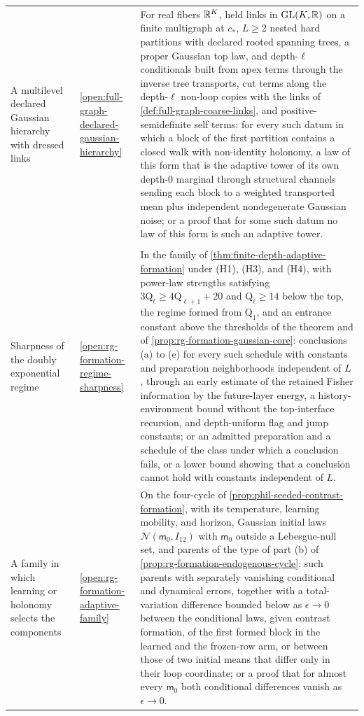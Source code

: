 {\begin{longtable}{@{}>{\raggedright\arraybackslash}p{}
>{\raggedright\arraybackslash}p{}
>{\raggedright\arraybackslash}p{}@{}}
A multilevel declared Gaussian hierarchy with dressed links & \cref{open:full-graph-declared-gaussian-hierarchy} & For real fibers $\mathbb R^K$, held links in $\mathrm{GL}(K,\mathbb R)$ on a finite multigraph at $c_*$, $L\ge2$ nested hard partitions with declared rooted spanning trees, a proper Gaussian top law, and depth-$\ell$ conditionals built from apex terms through the inverse tree transports, cut terms along the depth-$\ell$ non-loop copies with the links of \cref{def:full-graph-coarse-links}, and positive-semidefinite self terms: for every such datum in which a block of the first partition contains a closed walk with non-identity holonomy, a law of this form that is the adaptive tower of its own depth-$0$ marginal through structural channels sending each block to a weighted transported mean plus independent nondegenerate Gaussian noise; or a proof that for some such datum no law of this form is such an adaptive tower. \\
\multicolumn{3}{@{}l}{\textbf{Part III: formation and interpretation}} \\
Sharpness of the doubly exponential regime & \cref{open:rg-formation-regime-sharpness} & In the family of \cref{thm:finite-depth-adaptive-formation} under (H1), (H3), and (H4), with power-law strengths satisfying $3\mathrm Q_\ell\ge4\mathrm Q_{\ell+1}+20$ and $\mathrm Q_\ell\ge14$ below the top, the regime formed from $\mathrm Q_1$, and an entrance constant above the thresholds of the theorem and of \cref{prop:rg-formation-gaussian-core}: conclusions (a) to (e) for every such schedule with constants and preparation neighborhoods independent of $L$, through an early estimate of the retained Fisher information by the future-layer energy, a history-environment bound without the top-interface recursion, and depth-uniform flag and jump constants; or an admitted preparation and a schedule of the class under which a conclusion fails, or a lower bound showing that a conclusion cannot hold with constants independent of $L$. \\
A family in which learning or holonomy selects the components & \cref{open:rg-formation-adaptive-family} & On the four-cycle of \cref{prop:phil-seeded-contrast-formation}, with its temperature, learning mobility, and horizon, Gaussian initial laws $\mathcal N(\mathsf m_0,I_{12})$ with $\mathsf m_0$ outside a Lebesgue-null set, and parents of the type of part (b) of \cref{prop:rg-formation-endogenous-cycle}: such parents with separately vanishing conditional and dynamical errors, together with a total-variation difference bounded below as $\epsilon\to0$ between the conditional laws, given contrast formation, of the first formed block in the learned and the frozen-row arm, or between those of two initial means that differ only in their loop coordinate; or a proof that for almost every $\mathsf m_0$ both conditional differences vanish as $\epsilon\to0$. \\

\end{longtable}}
